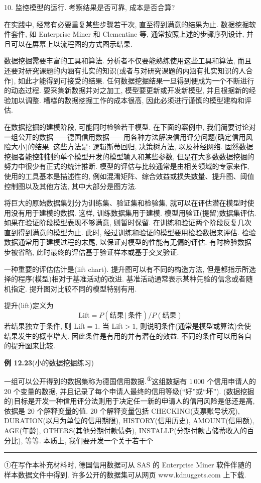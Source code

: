 
10. 监控模型的运行. 考察结果是否可靠, 成本是否合算?

在实践中, 经常有必要重复某些步骤若干次, 直至得到满意的结果为止. 数据挖掘软件套件, 如 Enterprise Miner 和 Clementine 等, 通常按照上述的步骤序列设计, 并且可以在屏幕上以流程图的方式图示结果.

数据挖掘需要丰富的工具和算法. 分析者不仅要能熟练使用这些工具和算法, 而且还要对研究课题的内涵有扎实的知识(或者与对研究课题的内涵有扎实知识的人合作), 如此才能得到可接受的结果. 任何数据挖掘结果一旦得到便成为一个不断进行的动态过程. 要采集新数据并对之加工, 模型要更新或开发新模型, 并且根据新的经验加以调整. 糟糕的数据挖掘工作的成本很高, 因此必须进行谨慎的模型建构和评估.


在数据挖掘的建模阶段, 可能同时检验若干模型. 在下面的案例中, 我们简要讨论对一组公开的数据——德国信用数据——用各种方法解决信用评分问题(确定信用风险大小)的结果. 这些方法是: 逻辑斯蒂回归, 决策树方法, 以及神经网络. 固然数据挖掘者能控制制约单个模型开发的模型输入和某些参数, 但是在大多数数据挖掘的努力中很少有正式的统计推断. 模型的评估与比较通常是由相关领域的专家来作, 使用的工具基本是描述性的, 例如混淆矩阵、综合效益或损失数量、提升图、阈值控制图以及其他方法, 其中大部分是图方法.

将巨大的原始数据集划分为训练集、验证集和检验集, 就可以在评估潜在模型时使用没有用于建模的数据. 这样, 训练数据集用于建模. 模型用验证(提留)数据集评估. 如果在验证阶段模型表现不够满意, 则暂时保留. 在训练和验证两个阶段反复几次直到得到满意的模型为止. 此时, 经过训练和验证的模型要用检验数据来评估. 检验数据通常用于建模过程的末尾, 以保证对模型的性能有无偏的评估. 有时检验数据步被省略, 此时最终的评估基于验证样本或基于交叉验证.

一种重要的评估估计是(lift chart). 提升图可以有不同的构造方法, 但是都指示所选择的程序(模型)相对于基准活动的改进. 基准活动通常表示某种先验的信念或者随机指定. 提升图对比较不同的模型特别有用.

提升(lift)定义为
\[
\mathrm{Lift}=P(\text{结果}\,|\,\text{条件})/P(\text{结果})
\]
若结果独立于条件, 则 Lift$=1$. 当 Lift$>1$, 则说明条件(通常是模型或算法)会使结果发生的概率增大. 因此条件是有用的并有潜在的效益. 不同的条件可以用各自的提升图来比较.

\noindent\textbf{例 12.23}\quad (小的数据挖掘练习)

一组可以公开得到的数据集称为德国信用数据.\textsuperscript{①}这组数据有 $1\,000$ 个信用申请人的 20 个变量的数据, 并且记录了每个申请人最终的信用等级(“好”或“坏”). (数据挖掘的)目标是开发一种信用评分法则用于决定任一新的申请人的信用风险是低还是高, 依据是 20 个解释变量的值. 20 个解释变量包括 CHECKING(支票账号状况), DURATION(以月为单位的信用期限), HISTORY(信用历史), AMOUNT(信用额), AGE(年龄), OTHERS(其他分期付款债务), INSTALLP(分期付款占储蓄收入的百分比), 等等. 本质上, 我们要开发一个关于若干个

\vspace{6pt}
\noindent\rule{\linewidth}{0.4pt}
\par\vspace{2pt}
{\noindent ①\quad 在写作本补充材料时, 德国信用数据可从 SAS 的 Enterprise Miner 软件伴随的样本数据文件中得到. 许多公开的数据集可从网页 www.kdnuggets.com 上下载.\par}
